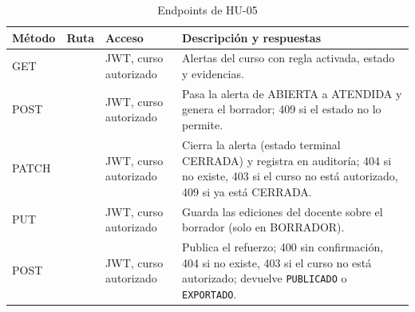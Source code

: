 \documentclass[11pt,a4paper]{article}
\newcommand{\hd}[1]{\textbf{#1}}
\begin{document}
\begin{table}[H]
\centering\small
\caption{Endpoints de HU-05}
\begin{tabularx}{\textwidth}{|R{1.5cm}|R{5.0cm}|R{2.2cm}|Y|}
\hline
\hd{Método} & \hd{Ruta} & \hd{Acceso} & \hd{Descripción y respuestas}\\ \hline
GET &  & JWT, curso autorizado & Alertas del curso con regla activada, estado y evidencias.\\ \hline
POST &  & JWT, curso autorizado & Pasa la alerta de ABIERTA a ATENDIDA y genera el borrador; 409 si el estado no lo permite.\\ \hline
PATCH &  & JWT, curso autorizado & Cierra la alerta (estado terminal CERRADA) y registra  en auditoría; 404 si no existe, 403 si el curso no está autorizado, 409 si ya está CERRADA.\\ \hline
PUT &  & JWT, curso autorizado & Guarda las ediciones del docente sobre el borrador (solo en BORRADOR).\\ \hline
POST &  & JWT, curso autorizado & Publica el refuerzo; 400 sin confirmación, 404 si no existe, 403 si el curso no está autorizado; devuelve \texttt{PUBLICADO} o \texttt{EXPORTADO}.\\ \hline
\end{tabularx}
\end{table}
\end{document}
